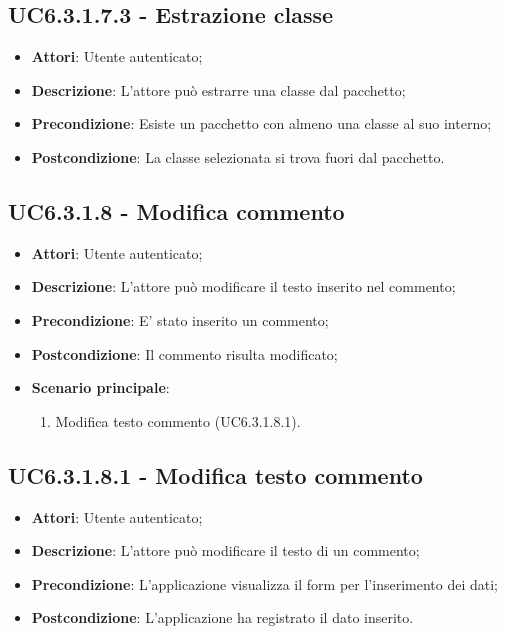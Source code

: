 \subsection{UC6.3.1.7.3 - Estrazione classe} 
\label{ssec:UC6.3.1.7.3} 
\begin{itemize} 
\item \textbf{Attori}: Utente autenticato;
\item \textbf{Descrizione}: L'attore può estrarre una classe dal pacchetto;
\item \textbf{Precondizione}: Esiste un pacchetto con almeno una classe al suo interno;
\item \textbf{Postcondizione}: La classe selezionata si trova fuori dal pacchetto.
\end{itemize} 
\subsection{UC6.3.1.8 - Modifica commento} 
\label{ssec:UC6.3.1.8} 
\begin{itemize} 
\item \textbf{Attori}: Utente autenticato;
\item \textbf{Descrizione}: L'attore può modificare il testo inserito nel commento;
\item \textbf{Precondizione}: E' stato inserito un commento;
\item \textbf{Postcondizione}: Il commento risulta modificato;
\item \textbf{Scenario principale}: \begin{enumerate}\item Modifica testo commento (UC6.3.1.8.1). 
 \end{enumerate}
\end{itemize} 
\subsection{UC6.3.1.8.1 - Modifica testo commento} 
\label{ssec:UC6.3.1.8.1} 
\begin{itemize} 
\item \textbf{Attori}: Utente autenticato;
\item \textbf{Descrizione}: L'attore può modificare il testo di un commento;
\item \textbf{Precondizione}: L'applicazione visualizza il form per l'inserimento dei dati;
\item \textbf{Postcondizione}: L'applicazione ha registrato il dato inserito.
\end{itemize} 
